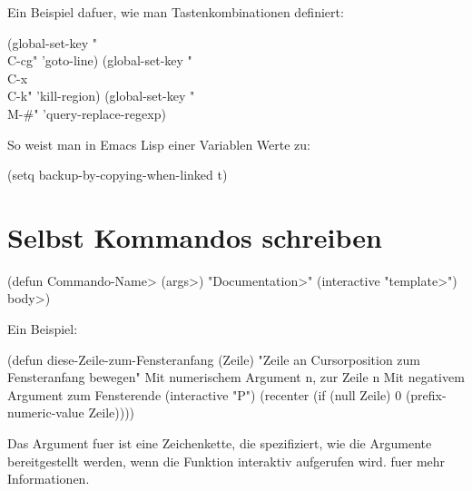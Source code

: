 
Ein Beispiel dafuer, wie man Tastenkombinationen definiert:

\beginexample%
(global-set-key "\\C-cg" 'goto-line)
(global-set-key "\\C-x\\C-k" 'kill-region)
(global-set-key "\\M-\#" 'query-replace-regexp)
\endexample

So weist man in Emacs Lisp einer Variablen Werte zu:

\beginexample%
(setq backup-by-copying-when-linked t)
\endexample

\section{Selbst Kommandos schreiben}

\beginexample%
(defun \<Commando-Name> (\<args>)
  "\<Documentation>"
  (interactive "\<template>")
  \<body>)
\endexample

Ein Beispiel:

\beginexample%
(defun diese-Zeile-zum-Fensteranfang (Zeile)
  "Zeile an Cursorposition zum Fensteranfang bewegen"
Mit numerischem Argument n, zur Zeile n
Mit negativem Argument zum Fensterende
  (interactive "P")
  (recenter (if (null Zeile)
                0
              (prefix-numeric-value Zeile))))
\endexample

Das Argument fuer  ist eine Zeichenkette, die spe\-zi\-fi\-ziert, wie die
Ar\-gu\-men\-te be\-reit\-ge\-stellt wer\-den, wenn die Funktion inter\-aktiv auf\-ge\-ru\-fen wird.
 fuer mehr Informationen.

\copyrightnotice

\bye


